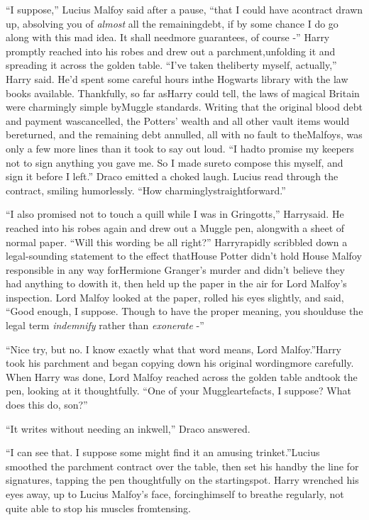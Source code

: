 ``I suppose,'' Lucius Malfoy said after a pause, ``that I could have acontract drawn up, absolving you of \emph{almost} all the remainingdebt, if by some chance I do go along with this mad idea. It shall needmore guarantees, of course -''
Harry promptly reached into his robes and drew out a parchment,unfolding it and spreading it across the golden table. ``I've taken theliberty myself, actually,'' Harry said. He'd spent some careful hours inthe Hogwarts library with the law books available. Thankfully, so far asHarry could tell, the laws of magical Britain were charmingly simple byMuggle standards. Writing that the original blood debt and payment wascancelled, the Potters' wealth and all other vault items would bereturned, and the remaining debt annulled, all with no fault to theMalfoys, was only a few more lines than it took to say out loud. ``I hadto promise my keepers not to sign anything you gave me. So I made sureto compose this myself, and sign it before I left.''
Draco emitted a choked laugh.
Lucius read through the contract, smiling humorlessly. ``How charminglystraightforward.''

``I also promised not to touch a quill while I was in Gringotts,'' Harrysaid. He reached into his robes again and drew out a Muggle pen, alongwith a sheet of normal paper. ``Will this wording be all right?'' Harryrapidly scribbled down a legal-sounding statement to the effect thatHouse Potter didn't hold House Malfoy responsible in any way forHermione Granger's murder and didn't believe they had anything to dowith it, then held up the paper in the air for Lord Malfoy's inspection.
Lord Malfoy looked at the paper, rolled his eyes slightly, and said,
``Good enough, I suppose. Though to have the proper meaning, you shoulduse the legal term \emph{indemnify} rather than \emph{exonerate} -''

``Nice try, but no. I know exactly what that word means, Lord Malfoy.''Harry took his parchment and began copying down his original wordingmore carefully.
When Harry was done, Lord Malfoy reached across the golden table andtook the pen, looking at it thoughtfully. ``One of your Muggleartefacts, I suppose? What does this do, son?''

``It writes without needing an inkwell,'' Draco answered.

``I can see that. I suppose some might find it an amusing trinket.''Lucius smoothed the parchment contract over the table, then set his handby the line for signatures, tapping the pen thoughtfully on the startingspot.
Harry wrenched his eyes away, up to Lucius Malfoy's face, forcinghimself to breathe regularly, not quite able to stop his muscles fromtensing.

